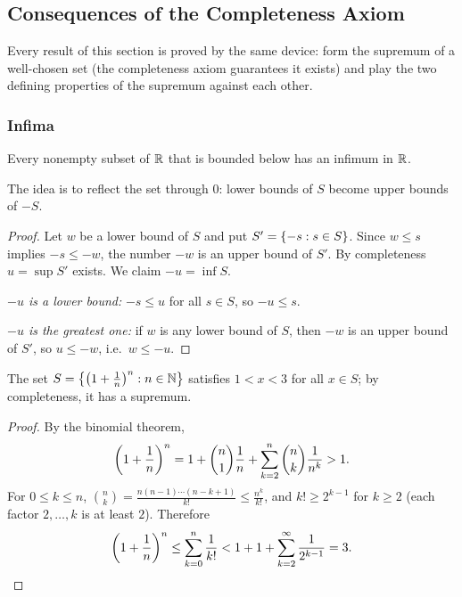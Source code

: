 \subsection{Consequences of the Completeness Axiom}\label{sec:completeness}

Every result of this section is proved by the same device: form the
supremum of a well-chosen set (the completeness axiom guarantees it exists)
and play the two defining properties of the supremum against each other.

\subsubsection{Infima}
\begin{corollary}\label{cor:inf-exists}
    Every nonempty subset of $\mathbb{R}$ that is bounded below has an infimum
    in $\mathbb{R}$.
\end{corollary}

The idea is to reflect the set through $0$: lower bounds of $S$ become
upper bounds of $-S$.

\begin{proof}
    Let $w$ be a lower bound of $S$ and put $S' = \left\{-s : s \in S\right\}$.
    Since $w\leq s$ implies $-s\leq -w$, the number $-w$ is an upper bound of
    $S'$. By completeness $u = \sup S'$ exists. We claim $-u = \inf S$.

    \emph{$-u$ is a lower bound:} $-s\leq u$ for all $s\in S$, so
    $-u\leq s$.

    \emph{$-u$ is the greatest one:} if $w$ is any lower bound of $S$, then
    $-w$ is an upper bound of $S'$, so $u\leq -w$, i.e.\ $w\leq -u$.
\end{proof}

\begin{example}
    The set $S = \left\{\left(1 + \frac{1}{n}\right)^n : n \in \mathbb{N}\right\}$ satisfies
    $1<x<3$ for all $x\in S$; by completeness, it has a supremum.
\end{example}

\begin{proof}
    By the binomial theorem,
    \begin{equation*}
        \left(1+\frac1n\right)^n
        =1+\binom n1\frac1n+\sum_{k=2}^n\binom nk\frac1{n^k}>1.
    \end{equation*}
    For $0\leq k\leq n$,
    $\binom nk=\frac{n(n-1)\cdots(n-k+1)}{k!}\leq\frac{n^k}{k!}$, and
    $k!\geq2^{k-1}$ for $k\geq2$ (each factor $2,\ldots,k$ is at least $2$).
    Therefore
    \begin{equation*}
        \left(1+\frac1n\right)^n
        \leq\sum_{k=0}^n\frac1{k!}
        < 1+1+\sum_{k=2}^{\infty}\frac1{2^{k-1}}=3.
    \end{equation*}
\end{proof}

